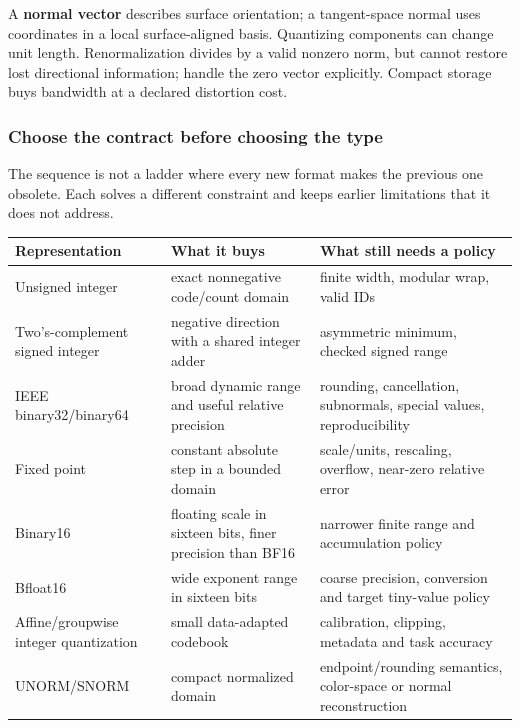 A \textbf{normal vector} describes surface orientation; a tangent-space normal uses coordinates in a local surface-aligned basis. Quantizing components can change unit length. Renormalization divides by a valid nonzero norm, but cannot restore lost directional information; handle the zero vector explicitly. Compact storage buys bandwidth at a declared distortion cost.

\subsubsection{Choose the contract before choosing the type}\label{05-engine-i-ch001-choose-the-contract-before-choosing-the-type}

The sequence is not a ladder where every new format makes the previous one obsolete. Each solves a different constraint and keeps earlier limitations that it does not address.

{\def\LTcaptype{none} %
\begin{longtable}[]{@{}
  >{\raggedright\arraybackslash}p{}
  >{\raggedright\arraybackslash}p{}
  >{\raggedright\arraybackslash}p{}@{}}
\toprule\noalign{}
\begin{minipage}[b]{\linewidth}\raggedright
Representation
\end{minipage} & \begin{minipage}[b]{\linewidth}\raggedright
What it buys
\end{minipage} & \begin{minipage}[b]{\linewidth}\raggedright
What still needs a policy
\end{minipage} \\
\midrule\noalign{}
\endhead
\bottomrule\noalign{}
\endlastfoot
Unsigned integer & exact nonnegative code/count domain & finite width, modular wrap, valid IDs \\
Two's-complement signed integer & negative direction with a shared integer adder & asymmetric minimum, checked signed range \\
IEEE binary32/binary64 & broad dynamic range and useful relative precision & rounding, cancellation, subnormals, special values, reproducibility \\
Fixed point & constant absolute step in a bounded domain & scale/units, rescaling, overflow, near-zero relative error \\
Binary16 & floating scale in sixteen bits, finer precision than BF16 & narrower finite range and accumulation policy \\
Bfloat16 & wide exponent range in sixteen bits & coarse precision, conversion and target tiny-value policy \\
Affine/groupwise integer quantization & small data-adapted codebook & calibration, clipping, metadata and task accuracy \\
UNORM/SNORM & compact normalized domain & endpoint/rounding semantics, color-space or normal reconstruction \\
\end{longtable}
}


